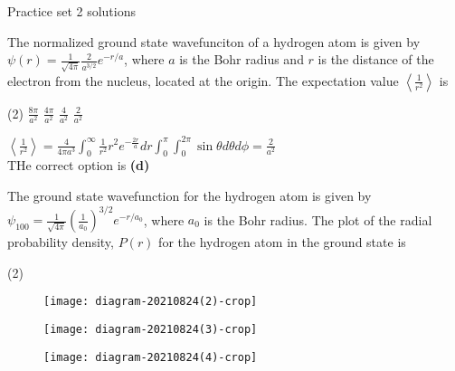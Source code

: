 \newpage
\begin{abox}
	Practice set 2 solutions
	\end{abox}
\begin{enumerate}
	\begin{minipage}{\textwidth}
		\item The normalized ground state wavefunciton of a hydrogen atom is given by $\psi(r)=\frac{1}{\sqrt{4 \pi}} \frac{2}{a^{3 / 2}} e^{-r / a}$, where $a$ is the Bohr radius and $r$ is the distance of the electron from the nucleus, located at the origin. The expectation value $\left\langle\frac{1}{r^{2}}\right\rangle$ is
	\end{minipage}
	\begin{tasks}(2)
		\task[\textbf{A.}] $\frac{8 \pi}{a^{2}}$
		\task[\textbf{B.}]$\frac{4 \pi}{a^{2}}$
		\task[\textbf{C.}]$\frac{4}{a^{2}}$
		\task[\textbf{D.}]$\frac{2}{a^{2}}$
	\end{tasks}
	\begin{answer}
		$\left\langle\frac{1}{r^{2}}\right\rangle=\frac{4}{4 \pi a^{3}} \int_{0}^{\infty} \frac{1}{r^{2}} r^{2} e^{-\frac{2 r}{a}} d r \int_{0}^{\pi} \int_{0}^{2 \pi} \sin \theta d \theta d \phi=\frac{2}{a^{2}}$\\
		THe correct option is \textbf{(d)}
	\end{answer}
	\begin{minipage}{\textwidth}
		\item The ground state wavefunction for the hydrogen atom is given by $\psi_{100}=\frac{1}{\sqrt{4 \pi}}\left(\frac{1}{a_{0}}\right)^{3 / 2} e^{-r / a_{0}}$, where $a_{0}$ is the Bohr radius. The plot of the radial probability density, $P(r)$ for the hydrogen atom in the ground state is
	\end{minipage}
	\begin{tasks}(2)
		\task[\textbf{A.}]\begin{figure}[H]
			\centering
			\texttt{[image: diagram-20210824(2)-crop]}
			
		\end{figure}
		\task[\textbf{B.}]\begin{figure}[H]
			\centering
			\texttt{[image: diagram-20210824(3)-crop]}
			
		\end{figure}
		\task[\textbf{C.}]\begin{figure}[H]
			\centering
			\texttt{[image: diagram-20210824(4)-crop]}
			

\end{figure}
\end{tasks}
\end{enumerate}
